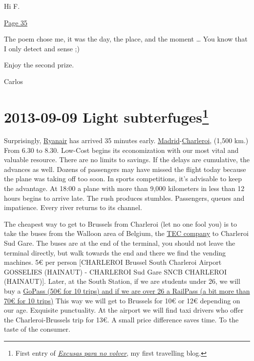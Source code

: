 \documentclass[]{book}
\let\rmarkdownfootnote\footnote%
\def\footnote{\protect\rmarkdownfootnote}
\begin{document}
Hi F.

\href{http://www.ccoo.cat/barcelones/documentacio/pdf_diversos/llibre_premi_Valverde_2011.pdf}{Page 35}

The poem chose me, it was the day, the place, and the moment \ldots{} You know that I only detect and sense ;)

Enjoy the second prize.

Carlos

\hypertarget{Excusas20130909}{%
\section*{\texorpdfstring{2013-09-09 Light subterfuges\footnote{First entry of \href{https://excusasparanovolver.blogspot.com/2013/09/subterfugios-de-luz.html}{\emph{Excusas para no volver}}, my first travelling blog.}}{2013-09-09 Light subterfuges}}\label{Excusas20130909}}

Surprisingly, \href{https://en.wikipedia.org/wiki/Ryanair}{Ryanair} has arrived 35 minutes early. \href{https://en.wikipedia.org/wiki/Madrid}{Madrid}-\href{https://en.wikipedia.org/wiki/Charleroi}{Charleroi}, (1,500 km.) From 6.30 to 8.30. Low-Cost begins its economization with our most vital and valuable resource. There are no limits to savings. If the delays are cumulative, the advances as well. Dozens of passengers may have missed the flight today because the plane was taking off too soon. In sports competitions, it's advisable to keep the advantage. At 18:00 a plane with more than 9,000 kilometers in less than 12 hours begins to arrive late. The rush produces stumbles. Passengers, queues and impatience. Every river returns to its channel.

The cheapest way to get to Brussels from Charleroi (let no one fool you) is to take the buses from the Walloon area of Belgium, the \href{https://www.infotec.be/}{TEC company} to Charleroi Sud Gare. The buses are at the end of the terminal, you should not leave the terminal directly, but walk towards the end and there we find the vending machines. 5€ per person {[}CHARLEROI Brussel South Charleroi Airport GOSSELIES (HAINAUT) - CHARLEROI Sud Gare SNCB CHARLEROI (HAINAUT){]}. Later, at the South Station, if we are students under 26, we will buy a \href{https://www.belgiantrain.be/en}{GoPass (50€ for 10 trips) and if we are over 26 a RailPass (a bit more than 70€ for 10 trips)} This way we will get to Brussels for 10€ or 12€ depending on our age. Exquisite punctuality. At the airport we will find taxi drivers who offer the Charleroi-Brussels trip for 13€. A small price difference saves time. To the taste of the consumer.
\end{document}
